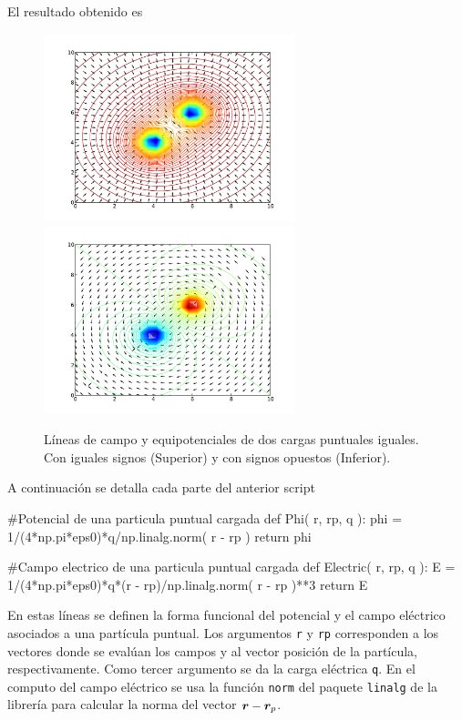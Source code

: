 El resultado obtenido es


\begin{figure}[htbp]
	\centering
	\includegraphics[width=0.65\textwidth]
	{./pictures/demo2_02.pdf}
	\includegraphics[width=0.65\textwidth]
	{./pictures/demo2_02(2).pdf}

	\caption{\small{Líneas de campo y equipotenciales de dos cargas 
	puntuales iguales. Con iguales signos (Superior) y con signos opuestos
	(Inferior).}}
	
	\label{fig:field_lines}
\end{figure}

A continuación se detalla cada parte del anterior script


\begin{listing}[style=python, numbers = none]
#Potencial de una particula puntual cargada
def Phi( r, rp, q ):
    phi = 1/(4*np.pi*eps0)*q/np.linalg.norm( r - rp )
    return phi

#Campo electrico de una particula puntual cargada
def Electric( r, rp, q ):
    E = 1/(4*np.pi*eps0)*q*(r - rp)/np.linalg.norm( r - rp )**3
    return E
\end{listing}
En estas líneas se definen la forma funcional del potencial y el campo
eléctrico asociados a una partícula puntual. Los argumentos \texttt{r} y
\texttt{rp} corresponden a los vectores donde se evalúan los campos y al 
vector posición de la partícula, respectivamente. Como tercer argumento se
da la carga eléctrica \texttt{q}. En el computo del campo eléctrico se usa
la función \texttt{norm} del paquete \texttt{linalg} de la librería \numpy
para calcular la norma del vector $\boldsymbol{ r } - \boldsymbol{ r }_p$.


